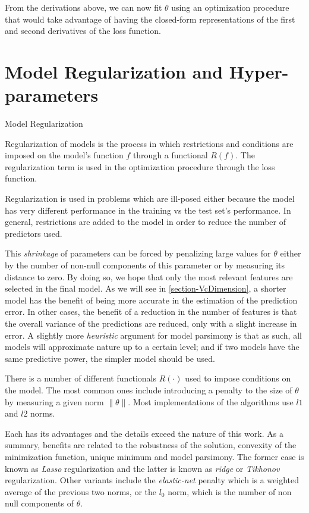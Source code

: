 From the derivations above, we can now fit $\theta$ using an optimization procedure that would take advantage of having the closed-form representations of the first and second derivatives of the loss function.


\section{Model Regularization and Hyper-parameters}\label{section-hyperParametersRegularization}


\begin{definition}{Model Regularization}

Regularization of models is the process in which restrictions and conditions are imposed on the model's function $f$ through a functional $ R(f)$. The regularization term is used in the optimization procedure through the loss function.

\end{definition}

Regularization is used in problems which are ill-posed either because the model has very different performance in the training vs the test set's performance. In general, restrictions are added to the model in order to reduce the number of predictors used.

This \textit{shrinkage} of parameters can be forced by penalizing large values for $\theta$ either by the number of non-null components of this parameter or by measuring its distance to zero. By doing so, we hope that only the most relevant features are selected in the final model. As we will see in \cref{section-VcDimension}, a shorter model has the benefit of being more accurate in the estimation of the prediction error. In other cases, the benefit of a reduction in the number of features is that the overall variance of the predictions are reduced, only with a slight increase in error. A slightly more \textit{heuristic} argument for model parsimony is that as such, all models will approximate nature up to a certain level; and if two models have the same predictive power, the simpler model should be used.


There is a number of different functionals $R(\cdot)$ used to impose conditions on the model. The most common ones include introducing a penalty to the size of $\theta$ by measuring a given norm $\| \theta \|$. Most implementations of the algorithms use $l1$ and $l2$ norms.

Each has its advantages and the details exceed the nature of this work. As a summary, benefits are related to the robustness of the solution, convexity of the minimization function, unique minimum and model parsimony. The former case is known as \textit{ Lasso} regularization and the latter is known as \textit{ridge} or \textit{Tikhonov} regularization. Other variants include the \textit{elastic-net} penalty which is a weighted average of the previous two norms, or the $l_0$ norm, which is the number of non null components of $\theta$.


